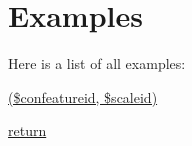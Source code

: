 \section{Examples}
Here is a list of all examples\-:\begin{DoxyCompactItemize}
\item 
\hyperlink{_c_1_2_users_2gautier_2_documents_2conf_2confeature_2lib_8php-example}{(\$confeatureid, \$scaleid)}
\item 
\hyperlink{return-example}{return}
\end{DoxyCompactItemize}

